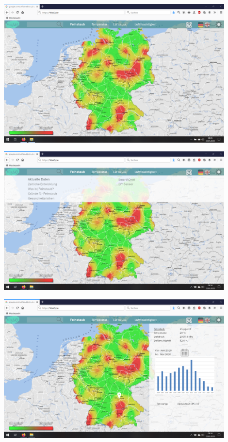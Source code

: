 \begin{center}
	\includegraphics[width=0.9\textwidth]{media/Startseite} 

	\includegraphics[width=0.9\textwidth]{media/Menue} 

\vspace{1cm}
	
	\includegraphics[width=0.9\textwidth]{media/Aktuelle-Daten} 


\end{center}
